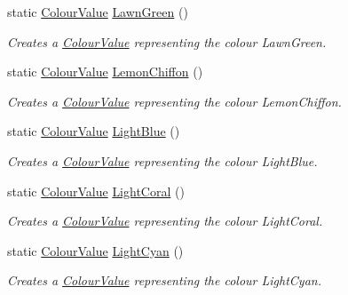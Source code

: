 \begin{DoxyCompactItemize}
static \hyperlink{classMezzanine_1_1ColourValue}{ColourValue} \hyperlink{classMezzanine_1_1ColourValue_afe3fe58f95366e7ced4eff85a29af8dc}{LawnGreen} ()
\begin{DoxyCompactList}\small\item\em Creates a \hyperlink{classMezzanine_1_1ColourValue}{ColourValue} representing the colour LawnGreen. \item\end{DoxyCompactList}\item 
static \hyperlink{classMezzanine_1_1ColourValue}{ColourValue} \hyperlink{classMezzanine_1_1ColourValue_aebcd87612a392e74da8216a90c9b0d00}{LemonChiffon} ()
\begin{DoxyCompactList}\small\item\em Creates a \hyperlink{classMezzanine_1_1ColourValue}{ColourValue} representing the colour LemonChiffon. \item\end{DoxyCompactList}\item 
static \hyperlink{classMezzanine_1_1ColourValue}{ColourValue} \hyperlink{classMezzanine_1_1ColourValue_ad52937ebaaddc42e064d87b0575e8891}{LightBlue} ()
\begin{DoxyCompactList}\small\item\em Creates a \hyperlink{classMezzanine_1_1ColourValue}{ColourValue} representing the colour LightBlue. \item\end{DoxyCompactList}\item 
static \hyperlink{classMezzanine_1_1ColourValue}{ColourValue} \hyperlink{classMezzanine_1_1ColourValue_a34f09d54d721ea80b2983c1b7e3bbe28}{LightCoral} ()
\begin{DoxyCompactList}\small\item\em Creates a \hyperlink{classMezzanine_1_1ColourValue}{ColourValue} representing the colour LightCoral. \item\end{DoxyCompactList}\item 
static \hyperlink{classMezzanine_1_1ColourValue}{ColourValue} \hyperlink{classMezzanine_1_1ColourValue_ab59f4a2c7199612169fde447a04222a9}{LightCyan} ()
\begin{DoxyCompactList}\small\item\em Creates a \hyperlink{classMezzanine_1_1ColourValue}{ColourValue} representing the colour LightCyan. \item\end{DoxyCompactList}\item 

\end{DoxyCompactItemize}

